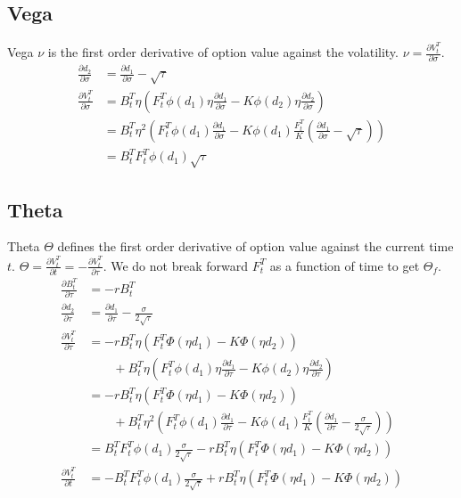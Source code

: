 \documentclass{article}
\begin{document}
\subsection{Vega}

Vega $ \nu $ is the first order derivative of option value against the volatility.
$ \nu = \frac{\partial V_t^T}{\partial \sigma} $.
\begin{align} \label{Vega derivation}
    \frac{\partial d_2}{\partial \sigma} &= \frac{\partial d_1}{\partial \sigma} - \sqrt{\tau} \nonumber \\
    \frac{\partial V_t^T}{\partial \sigma} &= B_t^T \eta \left(F_t^T \phi(d_1) \eta \frac{\partial d_1}{\partial \sigma} - K \phi(d_2) \eta \frac{\partial d_2}{\partial \sigma} \right) \nonumber \\
    &= B_t^T \eta^2 \left(F_t^T \phi(d_1) \frac{\partial d_1}{\partial \sigma} - K \phi(d_1) \frac{F_t^T}{K} (\frac{\partial d_1}{\partial \sigma} - \sqrt{\tau}) \right) \nonumber \\
    &= B_t^T F_t^T \phi(d_1) \sqrt{\tau}
\end{align}

\subsection{Theta}

Theta $ \Theta $ defines the first order derivative of option value against the current time $ t $.
$ \Theta = \frac{\partial V_t^T}{\partial t} = -\frac{\partial V_t^T}{\partial \tau}$.
We do not break forward $ F_t^T $ as a function of time to get $ \Theta_f $.
\begin{align} \label{Theta_f derivation}
    \frac{\partial B_t^T}{\partial \tau} &= -r B_t^T \nonumber \\
    \frac{\partial d_2}{\partial \tau} &= \frac{\partial d_1}{\partial \tau} - \frac{\sigma}{2 \sqrt{\tau}} \nonumber \\
    \frac{\partial V_t^T}{\partial \tau} &= -r B_t^T \eta \left(F_t^T \Phi(\eta d_1) - K \Phi(\eta d_2) \right) \nonumber \\
    &\quad \quad + B_t^T \eta \left(F_t^T \phi(d_1) \eta \frac{\partial d_1}{\partial \tau} - K \phi(d_2) \eta \frac{\partial d_2}{\partial \tau}\right) \nonumber \\
    &= -r B_t^T \eta \left(F_t^T \Phi(\eta d_1) - K \Phi(\eta d_2) \right) \nonumber \\
    &\quad \quad + B_t^T \eta^2 \left(F_t^T \phi(d_1) \frac{\partial d_1}{\partial \tau} - K \phi(d_1) \frac{F_t^T}{K} \left(\frac{\partial d_1}{\partial \tau} - \frac{\sigma}{2 \sqrt{\tau}}\right)\right) \nonumber \\
    &= B_t^T F_t^T \phi(d_1) \frac{\sigma}{2 \sqrt{\tau}} - r B_t^T \eta \left(F_t^T \Phi(\eta d_1) - K \Phi(\eta d_2) \right) \nonumber \\
    \frac{\partial V_t^T}{\partial t} &= -B_t^T F_t^T \phi(d_1) \frac{\sigma}{2 \sqrt{\tau}} + r B_t^T \eta \left(F_t^T \Phi(\eta d_1) - K \Phi(\eta d_2) \right)
\end{align}
\end{document}
